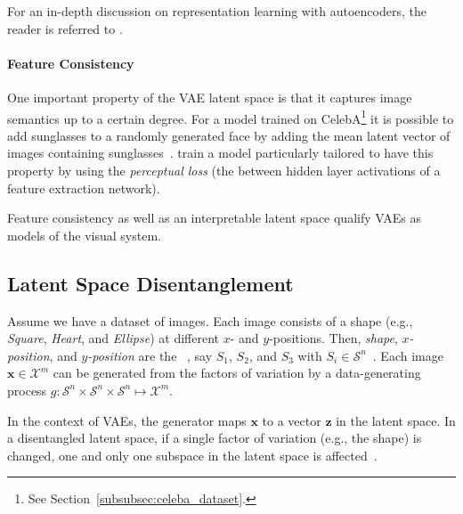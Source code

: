 For an in-depth discussion on representation learning with autoencoders, the reader is referred to \citet{tschannen2018recent}.

\paragraph{Feature Consistency}

One important property of the \ac{VAE} latent space is that it captures image semantics up to a certain degree.
For a model trained on CelebA\footnote{See Section~\ref{subsubsec:celeba_dataset}.} it is possible to add sunglasses to a randomly generated face by adding the mean latent vector of images containing sunglasses~\citep{larsen2015autoencoding,radford2016deep,hou2017deep}.
\citet{hou2017deep} train a model particularly tailored to have this property by using the \textit{perceptual loss} (the between hidden layer activations of a feature extraction network).

Feature consistency as well as an interpretable latent space qualify \acp{VAE} as models of the visual system.

\subsection{Latent Space Disentanglement}\label{subsec:feature-disentanglement}
Assume we have a dataset of images.
Each image consists of a shape (e.g., \textit{Square}, \textit{Heart}, and \textit{Ellipse}) at different $x$- and $y$-positions.
Then, \textit{shape}, $x$\textit{-position}, and $y$\textit{-position} are the ~\citep{Shu2020Weakly,higgins2018towards}, say $S_1$, $S_2$, and $S_3$ with $S_i\in \mathcal{S}^n$~\citep{Shu2020Weakly}.
Each image $\bm{x}\in \mathcal{X}^m$ can be generated from the factors of variation by a data-generating process $g: \mathcal{S}^n\times \mathcal{S}^n\times \mathcal{S}^n\mapsto \mathcal{X}^m$.

In the context of \acp{VAE}, the generator maps $\bm{x}$ to a vector $\bm{z}$ in the latent space.
In a disentangled latent space, if a single factor of variation (e.g., the shape) is changed, one and only one subspace in the latent space is affected~\citep{higgins2018towards}.

